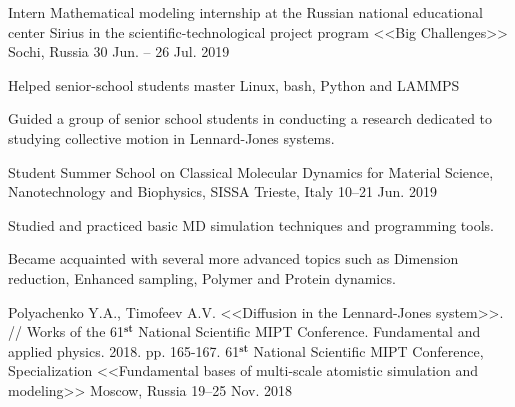 \begin{cventries}
  \cventry
    {Intern} %
    {Mathematical modeling internship at the Russian national educational center Sirius in the scientific-technological project program <<Big Challenges>>} %
    {Sochi, Russia} %
    {30 Jun. -- 26 Jul. 2019} %
    {
      \begin{cvitems} %
        \item {Helped senior-school students master Linux, bash, Python and LAMMPS}
        \item {Guided a group of senior school students in conducting a research dedicated to studying collective motion in Lennard-Jones systems.}
      \end{cvitems}
    }

  \cventry
    {Student} %
    {Summer School on Classical Molecular Dynamics for Material Science, Nanotechnology and Biophysics, SISSA} %
    {Trieste, Italy} %
    {10--21 Jun. 2019} %
    {
      \begin{cvitems} %
        \item {Studied and practiced basic MD simulation techniques and programming tools.}
        \item {Became acquainted with several more advanced topics such as Dimension reduction, Enhanced sampling, Polymer and Protein dynamics.}
      \end{cvitems}
    }
    
    
  \cventry
    {Polyachenko Y.A., Timofeev A.V. <<Diffusion in the Lennard-Jones system>>. // Works of the 61$^{\textbf{st}}$ National Scientific MIPT Conference. Fundamental and applied physics. 2018. pp. 165-167.} %
    {61$^{\textbf{st}}$ National Scientific MIPT Conference, Specialization <<Fundamental bases of multi-scale atomistic simulation and modeling>>} %
    {Moscow, Russia} %
    {19--25 Nov. 2018} %
    {
      \begin{cvitems} %
      \end{cvitems}
    }
    

\end{cventries}
